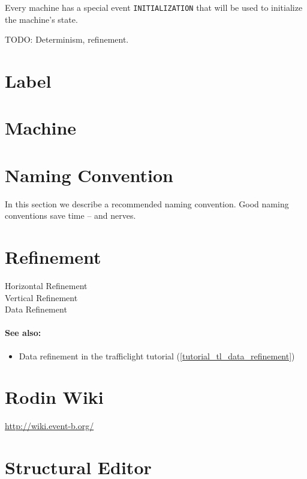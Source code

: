 Every machine has a special event \texttt{INITIALIZATION} that will be used to initialize the machine's state.

TODO: Determinism, refinement.

\section{Label}
\label{label}

\section{Machine}
\label{machine}

\section{Naming Convention}
\label{naming_convention}

In this section we describe a recommended naming convention.  Good naming conventions save time -- and nerves.

\section{Refinement}
\label{refinement}

\begin{description}
	\item[Horizontal Refinement]
	\item[Vertical Refinement]
	\item[Data Refinement]
\end{description}

\paragraph*{See also:}
\begin{itemize}
\item Data refinement in the trafficlight tutorial (\ref{tutorial_tl_data_refinement})
\end{itemize}

\section{Rodin Wiki}
\label{rodin_wiki}

\url{http://wiki.event-b.org/}

\section{Structural Editor}
\label{structural_editor}

